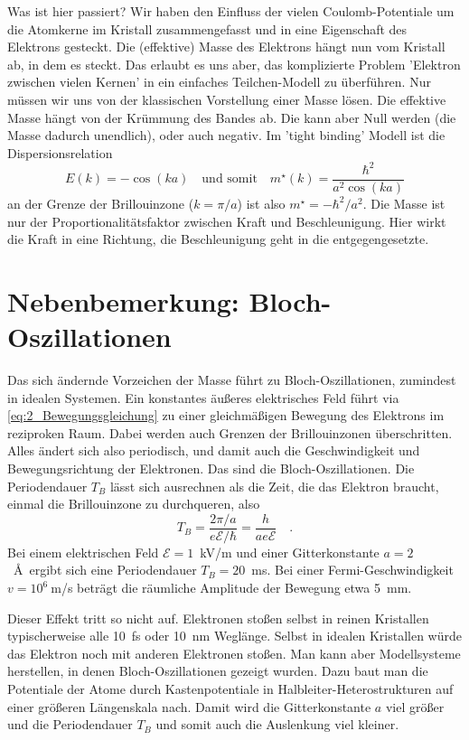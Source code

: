 Was ist hier passiert? 
Wir haben den Einfluss der vielen Coulomb-Potentiale um die Atomkerne im Kristall zusammengefasst und in eine Eigenschaft des Elektrons gesteckt. Die (effektive) Masse des Elektrons hängt nun vom Kristall ab, in dem es steckt. Das erlaubt es uns aber, das komplizierte Problem 'Elektron zwischen vielen Kernen' in ein einfaches Teilchen-Modell zu überführen. Nur müssen wir uns von der klassischen Vorstellung einer Masse lösen. Die effektive Masse hängt von der Krümmung des Bandes ab. Die kann aber Null werden (die Masse dadurch unendlich), oder auch negativ. Im 'tight binding' Modell ist die Dispersionsrelation
\begin{equation}
   E(k) = - \cos ( k a ) \quad \text{und somit} \quad    m^\star(k) = \frac{\hbar^2}{a^2 \cos ( k a )}
\end{equation}
an der Grenze der Brillouinzone ($k = \pi / a$) ist also $m^\star = - \hbar^2 / a^2$. Die Masse ist nur der Proportionalitätsfaktor zwischen Kraft und Beschleunigung. Hier wirkt die Kraft in eine Richtung, die Beschleunigung geht in die entgegengesetzte.


\section{Nebenbemerkung: Bloch-Oszillationen}

Das sich ändernde Vorzeichen der Masse führt zu Bloch-Oszillationen, zumindest in idealen Systemen. Ein konstantes äußeres elektrisches Feld führt via  \ref{eq:2_Bewegungsgleichung} zu einer gleichmäßigen Bewegung des Elektrons im reziproken Raum. Dabei werden auch Grenzen der Brillouinzonen überschritten. Alles ändert sich also periodisch, und damit auch die Geschwindigkeit und Bewegungsrichtung der Elektronen. Das sind die Bloch-Oszillationen. Die Periodendauer $T_B$ lässt sich ausrechnen als die Zeit, die das Elektron braucht, einmal die Brillouinzone zu durchqueren, also
\begin{equation}
   T_B = \frac{2\pi / a}{e \mathcal{E} / \hbar} = \frac{h}{a e  \mathcal{E}} \quad .
\end{equation}
Bei einem elektrischen Feld $ \mathcal{E} =1 $~kV/m und einer Gitterkonstante $a= 2$~\AA\ ergibt sich eine Periodendauer $T_B = 20$~ms. Bei einer Fermi-Geschwindigkeit $v =10^6~$m/s beträgt die räumliche Amplitude der Bewegung etwa 5~mm. 

Dieser Effekt tritt so nicht auf. Elektronen stoßen selbst in reinen Kristallen typischerweise alle 10~fs oder 10~nm Weglänge. Selbst in idealen Kristallen würde das Elektron noch mit anderen Elektronen stoßen. Man kann aber Modellsysteme herstellen, in denen Bloch-Oszillationen gezeigt wurden. Dazu baut man die Potentiale der Atome durch Kastenpotentiale in Halbleiter-Heterostrukturen auf einer größeren Längenskala nach. Damit wird die Gitterkonstante $a$ viel größer und die Periodendauer $T_B$ und somit auch die Auslenkung viel kleiner.



